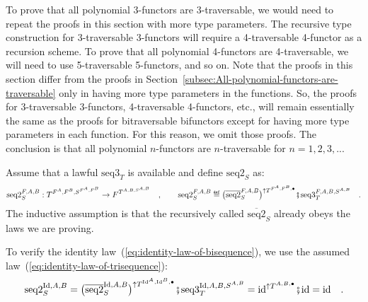 To prove that all polynomial 3-functors are 3-traversable, we would
need to repeat the proofs in this section with more type parameters.
The recursive type construction for 3-traversable 3-functors will
require a 4-traversable 4-functor as a recursion scheme. To prove
that all polynomial 4-functors are 4-traversable, we will need to
use 5-traversable 5-functors, and so on. Note that the proofs in this
section differ from the proofs in Section~\ref{subsec:All-polynomial-functors-are-traversable}
only in having more type parameters in the functions. So, the proofs
for 3-traversable 3-functors, 4-traversable 4-functors, etc., will
remain essentially the same as the proofs for bitraversable bifunctors
except for having more type parameters in each function. For this
reason, we omit those proofs. The conclusion is that all polynomial
$n$-functors are $n$-traversable for $n=1,2,3,...$

Assume that a lawful $\text{seq3}_{T}$ is available and define $\text{seq2}_{S}$
as:
\[
\text{seq2}_{S}^{F,A,B}:T^{F^{A},F^{B},S^{F^{A},F^{B}}}\rightarrow F^{T^{A,B,S^{A,B}}}\quad,\quad\quad\text{seq2}_{S}^{F,A,B}\triangleq\big(\overline{\text{seq2}}_{S}^{F,A,B}\big)^{\uparrow T^{F^{A},F^{B},\bullet}}\bef\text{seq3}_{T}^{F,A,B,S^{A,B}}\quad.
\]
The inductive assumption is that the recursively called $\overline{\text{seq2}}_{S}$
already obeys the laws we are proving.

To verify the identity law~(\ref{eq:identity-law-of-bisequence}),
we use the assumed law~(\ref{eq:identity-law-of-trisequence}):
\[
\text{seq2}_{S}^{\text{Id},A,B}=\big(\overline{\text{seq2}}_{S}^{\text{Id},A,B}\big)^{\uparrow T^{\text{Id}^{A},\text{Id}^{B},\bullet}}\bef\text{seq3}_{T}^{\text{Id},A,B,S^{A,B}}=\text{id}^{\uparrow T^{A,B,\bullet}}\bef\text{id}=\text{id}\quad.
\]

